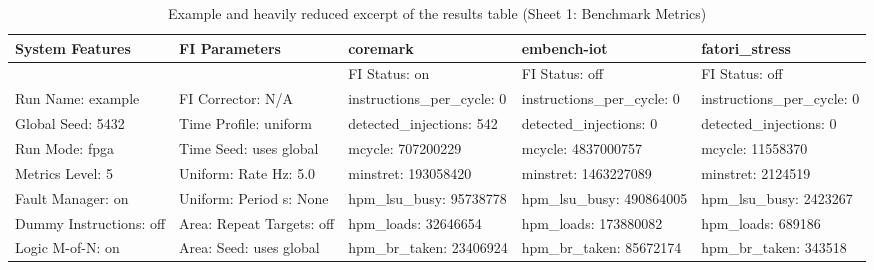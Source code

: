\begin{table}[H]
\centering
\scriptsize
\setlength{\tabcolsep}{2pt}
\caption{Example and heavily reduced excerpt of the results table (Sheet 1: Benchmark Metrics)}
\renewcommand{\arraystretch}{1.15}
\begin{tabular}{p{} p{} p{} p{} p{}}
\hline
System Features & FI Parameters & coremark & embench-iot & fatori\_stress\\
\hline
 &  & FI Status: on & FI Status: off & FI Status: off \\

Run Name: example &
FI Corrector: N/A &
instructions\_per\_cycle: 0 &
instructions\_per\_cycle: 0 &
instructions\_per\_cycle: 0 \\

Global Seed: 5432 &
Time Profile: uniform &
detected\_injections: 542 &
detected\_injections: 0 &
detected\_injections: 0 \\

Run Mode: fpga &
Time Seed: uses global &
mcycle: 707200229 &
mcycle: 4837000757 &
mcycle: 11558370 \\

Metrics Level: 5 &
Uniform: Rate Hz: 5.0 &
minstret: 193058420 &
minstret: 1463227089 &
minstret: 2124519 \\

Fault Manager: on &
Uniform: Period s: None &
hpm\_lsu\_busy: 95738778 &
hpm\_lsu\_busy: 490864005 &
hpm\_lsu\_busy: 2423267 \\

Dummy Instructions: off &
Area: Repeat Targets: off &
hpm\_loads: 32646654 &
hpm\_loads: 173880082 &
hpm\_loads: 689186 \\

Logic M-of-N: on &
Area: Seed: uses global &
hpm\_br\_taken: 23406924 &
hpm\_br\_taken: 85672174 &
hpm\_br\_taken: 343518 \\

\hline
\end{tabular}
\label{tab:results_table_benchmark_excerpt}
\end{table}



